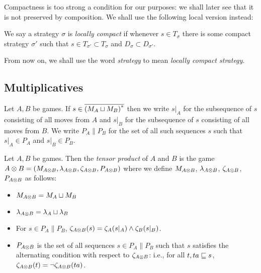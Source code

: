 \documentclass{article}
\begin{document}
Compactness is too strong a condition for our purposes: we shall later see that it is not preserved by composition.  We shall use the following local version instead:

\begin{definition}
  We say a strategy $\sigma$ is \emph{locally compact} if whenever $s\in T_\sigma$ there is some compact strategy $\sigma'$ such that $s\in T_{\sigma'}\subset T_\sigma$ and $D_\sigma\subset D_{\sigma'}$.
\end{definition}

From now on, we shall use the word \emph{strategy} to mean \emph{locally compact strategy}.

\subsection{Multiplicatives}

Let $A,B$ be games.  If $s\in {\overline{{(M_A\sqcup M_B)}^{*}}}$ then we write $s\vert_A$ for the subsequence of $s$ consisting of all moves from $A$ and $s\vert_B$ for the subsequence of $s$ consisting of all moves from $B$.  We write $P_A\|P_B$ for the set of all such sequences $s$ such that $s\vert_A\in P_A$ and $s\vert_B\in P_B$.  

\begin{definition}
  Let $A,B$ be games.  Then the \emph{tensor product} of $A$ and $B$ is the game $A\otimes B=(M_{A\otimes B}, \lambda_{A\otimes B}, \zeta_{A\otimes B}, P_{A\otimes B})$ where we define $M_{A\otimes B}$, $\lambda_{A\otimes B}$, $\zeta_{A\otimes B}$, $P_{A\otimes B}$ as follows:
  \begin{itemize}
    \item $M_{A\otimes B} = M_A \sqcup M_B$
    \item $\lambda_{A\otimes B} = \lambda_A \sqcup \lambda_B$
    \item For $s\in P_A\|P_B$, $\zeta_{A\otimes B}(s) = \zeta_A(s\vert_A) \wedge \zeta_B(s\vert_B)$.
    \item $P_{A\otimes B}$ is the set of all sequences $s\in P_A\|P_B$ such that $s$ satisfies the alternating condition with respect to $\zeta_{A\otimes B}$: i.e., for all $t,ta\sqsubseteq s$, $\zeta_{A\otimes B}(t) = \neg\zeta_{A\otimes B}(ta)$.  
  \end{itemize}
\end{definition}
\end{document}
